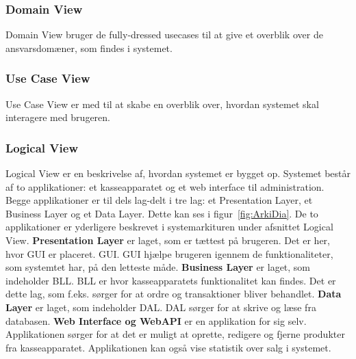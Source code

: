 \subsubsection{Domain View}
Domain View bruger de fully-dressed \gls{usecase}s til at give et overblik over de ansvarsdomæner, som findes i systemet.

\subsubsection{Use Case View}
Use Case View er med til at skabe en overblik over, hvordan \gls{system}et skal interagere med brugeren.

\subsubsection{Logical View}
Logical View er en beskrivelse af, hvordan systemet er bygget op. Systemet består af to applikationer: et kasseapparatet og et web interface til administration. Begge applikationer er til dels lag-delt i tre lag: et Presentation Layer, et Business Layer og et Data Layer. Dette kan ses i figur~\ref{fig:ArkiDia}. De to applikationer er yderligere beskrevet i systemarkituren under afsnittet Logical View. 
\newline\newline
\textbf{Presentation Layer} er laget, som er tættest på brugeren. Det er her, hvor \gls{GUI} er placeret. \gls{GUI}. \gls{GUI} hjælpe brugeren igennem de funktionaliteter, som systemtet har, på den letteste måde.
\newline\newline
\textbf{Business Layer} er laget, som indeholder \gls{BLL}. \gls{BLL} er hvor kasseapparatets funktionalitet kan findes. Det er dette lag, som f.eks. sørger for at ordre og transaktioner bliver behandlet.
\newline\newline
\textbf{Data Layer} er laget, som indeholder \gls{DAL}. \gls{DAL} sørger for at skrive og læse fra databasen.
\newline\newline
\textbf{Web Interface og WebAPI} er en applikation for sig selv. Applikationen sørger for at det er muligt at oprette, redigere og fjerne produkter fra kasseapparatet. Applikationen kan også vise statistik over salg i systemet. 


